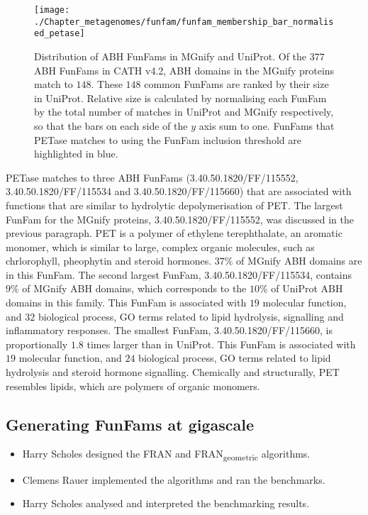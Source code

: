 \begin{figure}[!hbt]
    \centering
    \texttt{[image: ./Chapter\_metagenomes/funfam/funfam\_membership\_bar\_normalised\_petase]}
    \caption{%
        Distribution of ABH FunFams in MGnify and UniProt.
        Of the $377$ ABH FunFams in CATH v4.2, ABH domains in the MGnify proteins match to $148$.
        These $148$ common FunFams are ranked by their size in UniProt.
        Relative size is calculated by normalising each FunFam by the total number of matches in UniProt and MGnify respectively, so that the bars on each side of the $y$ axis sum to one.
        FunFams that PETase matches to using the FunFam inclusion threshold are highlighted in blue.
    }
    \label{fig:funfam_membership_bar_normalised_petase}
\end{figure}

PETase matches to three ABH FunFams (3.40.50.1820/FF/115552, 3.40.50.1820/FF/115534 and 3.40.50.1820/FF/115660) that are associated with functions that are similar to hydrolytic depolymerisation of PET. The largest FunFam for the MGnify proteins, 3.40.50.1820/FF/115552, was discussed in the previous paragraph. PET is a polymer of ethylene terephthalate, an aromatic monomer, which is similar to large, complex organic molecules, such as chrlorophyll, pheophytin and steroid hormones. $37\%$ of MGnify ABH domains are in this FunFam. The second largest FunFam, 3.40.50.1820/FF/115534, contains $9\%$ of MGnify ABH domains, which corresponds to the $10\%$ of UniProt ABH domains in this family. This FunFam is associated with $19$ molecular function, and $32$ biological process, GO terms related to lipid hydrolysis, signalling and inflammatory responses. The smallest FunFam, 3.40.50.1820/FF/115660, is proportionally $1.8$ times larger than in UniProt. This FunFam is associated with $19$ molecular function, and $24$ biological process, GO terms related to lipid hydrolysis and steroid hormone signalling. Chemically and structurally, PET resembles lipids, which are polymers of organic monomers.

\subsection{Generating FunFams at gigascale}

\begin{itemize}
    \item Harry Scholes designed the FRAN and FRAN\textsubscript{geometric} algorithms.
    \item Clemens Rauer implemented the algorithms and ran the benchmarks.
    \item Harry Scholes analysed and interpreted the benchmarking results.
\end{itemize}

